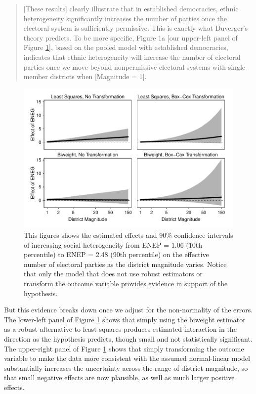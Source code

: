 \documentclass[12pt]{article}
\begin{document}
\begin{quote}
[These results] clearly illustrate that in established democracies, ethnic heterogeneity significantly increases the number of parties once the electoral system is sufficiently permissive. 
This is exactly what Duverger's theory predicts. 
To be more specific, Figure 1a [our upper-left panel of Figure \ref{fig:cg-fd-plots}], based on the pooled model with established democracies, indicates that ethnic heterogeneity will increase the number of electoral parties once we move beyond nonpermissive electoral systems with single-member districts when [Magnitude = 1].
\end{quote}

\begin{figure}[h!]
\begin{center}
\includegraphics[width = \textwidth]{figs/cg-fd-plots.pdf}
\caption{This figures shows the estimated effects and 90\% confidence intervals of increasing social heterogeneity from ENEP = 1.06 (10th percentile) to ENEP = 2.48 (90th percentile) on the effective number of electoral parties as the district magnitude varies. 
Notice that only the model that does not use robust estimators or transform the outcome variable provides evidence in support of the hypothesis.}\label{fig:cg-fd-plots}
\end{center}
\end{figure}

But this evidence breaks down once we adjust for the non-normality of the errors. 
The lower-left panel of Figure \ref{fig:cg-fd-plots} shows that simply using the biweight estimator as a robust alternative to least squares produces estimated interaction in the  direction as the hypothesis predicts, though small and not statistically significant. 
The upper-right panel of Figure \ref{fig:cg-fd-plots} shows that simply transforming the outcome variable to make the data more consistent with the assumed normal-linear model substantially increases the uncertainty across the range of district magnitude, so that small negative effects are now plausible, as well as much larger positive effects. 
\end{document}
